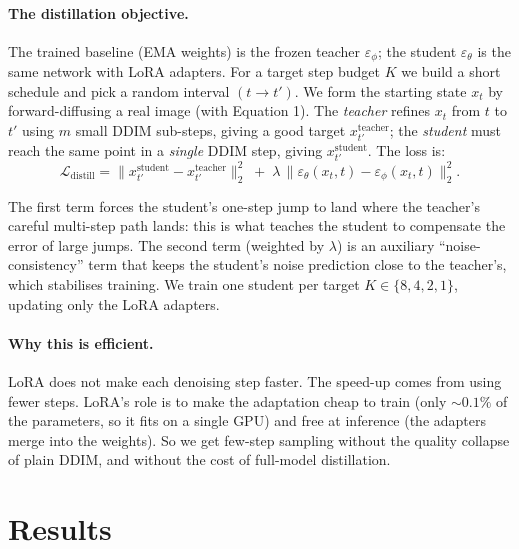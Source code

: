 \documentclass[11pt]{article}
\begin{document}
\paragraph{The distillation objective.} The trained baseline (EMA weights) is the frozen
teacher $\varepsilon_\phi$; the student $\varepsilon_\theta$ is the same network with LoRA
adapters. For a target step budget $K$ we build a short schedule and pick a random interval
$(t \rightarrow t')$. We form the starting state $x_t$ by forward-diffusing a real image
(with Equation 1). The \emph{teacher} refines $x_t$ from $t$ to $t'$ using $m$ small
DDIM sub-steps, giving a good target $x_{t'}^{\text{teacher}}$; the \emph{student} must reach
the same point in a \emph{single} DDIM step, giving $x_{t'}^{\text{student}}$. The loss is:
\begin{equation}
  \mathcal{L}_{\mathrm{distill}} =
  \big\| x_{t'}^{\text{student}} - x_{t'}^{\text{teacher}} \big\|_2^2
  \;+\; \lambda\,
  \big\| \varepsilon_\theta(x_t,t) - \varepsilon_\phi(x_t,t) \big\|_2^2 .
  \label{eq:distill}
\end{equation}

\noindent The first term forces the student's one-step jump to land where
the teacher's careful multi-step path lands: this is what teaches the student to compensate the error of large jumps. The second term (weighted by
$\lambda$) is an auxiliary ``noise-consistency'' term that keeps the student's noise
prediction close to the teacher's, which stabilises training. We train one student per target
$K\in\{8,4,2,1\}$, updating only the LoRA adapters.

\paragraph{Why this is efficient.} LoRA does not make each denoising step faster. The
speed-up comes from using fewer steps. LoRA's role is to make the adaptation cheap to
train (only ${\sim}0.1\%$ of the parameters, so it fits on a single GPU) and free at
inference (the adapters merge into the weights). So we get few-step sampling without
the quality collapse of plain DDIM, and without the cost of full-model distillation.

\section{Results}
\end{document}
